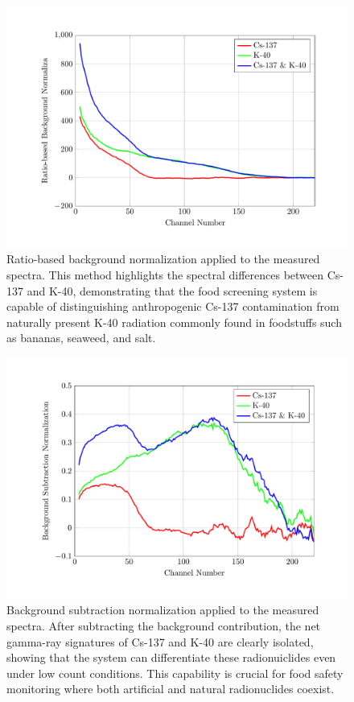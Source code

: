 \documentclass[10pt]{wlscirep}
\begin{document}
\begin{figure}[ht]
\centering
\includegraphics[width=\linewidth]{figure/fig08_FI_CSN.pdf}
\caption{Ratio-based background normalization applied to the measured spectra. This method highlights the spectral differences between Cs-137 and K-40, demonstrating that the food screening system is capable of distinguishing anthropogenic Cs-137 contamination from naturally present K-40 radiation commonly found in foodstuffs such as bananas, seaweed, and salt.}
\label{fig:fi_csn}
\end{figure}

\begin{figure}[ht]
\centering
\includegraphics[width=\linewidth]{figure/fig09_FI_CSRN.pdf}
\caption{Background subtraction normalization applied to the measured spectra. After subtracting the background contribution, the net gamma-ray signatures of Cs-137 and K-40 are clearly isolated, showing that the system can differentiate these radionuiclides even under low count conditions. This capability is crucial for food safety monitoring where both artificial and natural radionuclides coexist.}
\label{fig:fi_csbs}
\end{figure}
\end{document}

